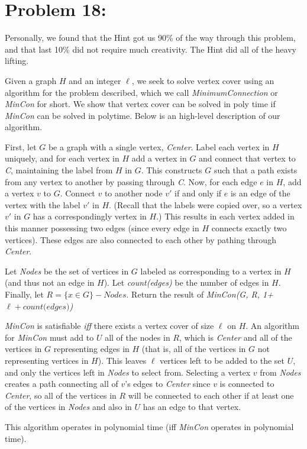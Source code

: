 \documentclass[12pt]{article}
\begin{document}
\section*{Problem 18: }

Personally, we found that the Hint got us 90\% of the way through this problem, and that last 10\% did not require much creativity.
 The Hint did all of the heavy lifting.
 
 Given a graph $H$ and an integer $\ell$, we seek to solve vertex cover using an algorithm for the problem described, which we call \textit{MinimumConnection} or \textit{MinCon} for short. We show that vertex cover can be solved in poly time if \textit{MinCon} can be solved in polytime. Below is an high-level description of our algorithm.

First, let $G$ be a graph with a single vertex, \textit{Center}. Label each vertex in $H$ uniquely, and for each vertex in $H$ add a vertex in $G$ and connect that vertex to \textit{C}, maintaining the label from $H$ in $G$. This constructs $G$ such that a path exists from any vertex to another by passing through \textit{C}. Now, for each edge $e$ in $H$, add a vertex $v$ to $G$. Connect $v$ to another node $v'$ if and only if $e$ is an edge of the vertex with the label $v'$ in $H$. (Recall that the labels were copied over, so a vertex $v'$ in $G$ has a correspondingly vertex in $H$.) This results in each vertex added in this manner possessing two edges (since every edge in $H$ connects exactly two vertices). These edges are also connected to each other by pathing through \textit{Center}. 

Let \textit{Nodes} be the set of vertices in $G$ labeled as corresponding to a vertex in $H$ (and thus not an edge in $H$). Let \textit{count(edges)} be the number of edges in $H$. Finally, let $R = \{ x \in G\} - \textit{Nodes}$. Return the result of \textit{MinCon(G, R, 1+ $\ell + \textit{count(edges)}$)} 

\textit{MinCon} is satisfiable \textit{iff} there exists a vertex cover of size $\ell$ on $H$. An algorithm for \textit{MinCon} must add to $U$ all of the nodes in $R$, which is \textit{Center} and all of the vertices in $G$ representing edges in $H$ (that is, all of the vertices in $G$ not representing vertices in $H$). This leaves $\ell$ vertices left to be added to the set $U$, and only the vertices left in \textit{Nodes} to select from. Selecting a vertex $v$ from \textit{Nodes} creates a path connecting all of $v$'s edges to \textit{Center} since $v$ is connected to \textit{Center}, so all of the vertices in $R$ will be connected to each other if at least one of the vertices in \textit{Nodes} and also in $U$ has an edge to that vertex.

This algorithm operates in polynomial time (iff \textit{MinCon} operates in polynomial time). 
\end{document}

